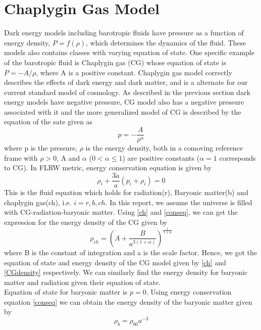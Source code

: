 \section{Chaplygin Gas Model}
Dark energy models including barotropic fluids have pressure as a function of energy density, $P=f(\rho)$, which determines the dynamics of the fluid. These models also contains classes with varying equation of state. One specific example of the barotropic fluid is Chaplygin gas (CG) whose equation of state is $P=-A/\rho$, where A is a positive constant. Chaplygin gas  model  correctly describes the effects  of  dark  energy  and  dark  matter,  and  is a alternate for our current standard model of cosmology. As described in the previous section dark energy models have negative pressure, CG model also has a negative pressure associated with it and the more generalized model of CG is described by the equation of the sate given as
\begin{equation}\label{ch}
    p=-\frac{A}{\rho ^\alpha}
\end{equation}
where p is the pressure, $\rho$ is the energy density, both in a comoving reference frame with $\rho>0$, A and $\alpha$ ($0<\alpha \leq 1$) are positive constants ($\alpha=1$ corresponds to CG). In FLRW metric, energy conservation equation is given by
\begin{equation}\label{conseq}
    \dot{\rho}_{i}+\frac{3 \dot{a}}{a}\left(p_{i}+\rho_{i}\right)=0
\end{equation}
This is the fluid equation which holds for radiation(r), Baryonic matter(b) and chaplygin gas(ch), i.e. $i={r,b,ch}$. In this report, we assume the universe is filled with CG-radiation-baryonic matter. Using \ref{ch} and \ref{conseq}, we can get the expression for the energy density of the CG given by 
\begin{equation}\label{CGdensity}
    \rho_{ch}=\left(A+\frac{B}{a^{3(1+\alpha)}}\right)^{\frac{1}{1+\alpha}}
\end{equation}
where B is the constant of integration and a is the scale factor. Hence, we got the equation of state and energy density of the CG model given by \ref{ch} and \ref{CGdensity} respectively. We can similarly find the  energy density for baryonic matter and radiation given their equation of state. \\
Equation of state for baryonic matter is $p=0$. Using energy conservation equation \ref{conseq} we can obtain the energy density of the baryonic matter given by 
\begin{equation}\label{bar}
    \rho_b=\rho_{b0} a^{-3}
\end{equation}
